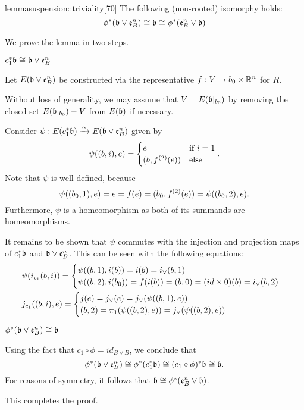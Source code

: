 \begin{mystatement}{lemma}{suspension::triviality}[70] The following (non-rooted) isomorphy holds: \[ \ind{\phi}(\bb \vee \be{B}) \cong \bb \cong \ind{\phi}(\be{B} \vee \bb) \] \end{mystatement}

\begin{myproof} We prove the lemma in two steps. \begin{steps} \item $\ind{c_1}\bb \cong \bb \vee \be{B}$

Let $E(\bb \vee \be{B})$ be constructed via the representative $f: V \to b_0 \cross \R^n$ for $R$.

Without loss of generality, we may assume that $V = E(\bbb)$ by removing the closed set $E(\bbb) - V$ from $E(\bb)$ if necessary.

Consider $\psi: E(\ind{c_1}\bb) \isomto E(\bb \vee \be{B})$ given by \[ \psi((b, i), e) = \case{e}{(b, \snd{f}(e))}{i = 1}. \] Note that $\psi$ is well-defined, because \[ \psi((b_0, 1), e) = e = f(e) = (b_0, \snd{f}(e)) = \psi((b_0, 2), e). \] Furthermore, $\psi$ is a homeomorphism as both of its summands are homeomorphisms.

It remains to be shown that $\psi$ commutes with the injection and projection maps of $\ind{c_1}\bb$ and $\bb \vee \be{B}$. This can be seen with the following equations: \begin{align} &\psi(i_{c_1}(b, i)) = \casenif{\psi((b, 1), i(b)) = i(b) = i_\vee(b, 1)}{\psi((b, 2), i(b_0)) = f(i(b)) = (b, 0) = (id \cross 0)(b) = i_\vee(b, 2)} \\ &j_{c_1}((b, i), e) = \casenif{j(e) = j_\vee(e) = j_\vee(\psi((b, 1), e))}{(b, 2) = \pi_1(\psi((b, 2), e)) = j_\vee(\psi((b, 2), e))} \end{align}

\item $\ind{\phi}(\bb \vee \be{B}) \cong \bb$

Using the fact that $c_1 \circ \phi = id_{B \vee B}$, we conclude that \[ \ind{\phi}(\bb \vee \be{B}) \cong \ind{\phi}(\ind{c_1}\bb) \cong \ind{(c_1 \circ \phi)}\bb \cong \bb. \] For reasons of symmetry, it follows that $\bb \cong \ind{\phi}(\be{B} \vee \bb)$. \end{steps} This completes the proof. \end{myproof}